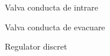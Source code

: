 \documentclass[12pt,english]{article}
\begin{document}
\begin{figure}[H]
  \centering
  \caption{Valva conducta de intrare}
\end{figure}

\begin{figure}[H]
  \centering
  \caption{Valva conducta de evacuare}
\end{figure}

\begin{figure}[H]
  \centering
  \caption{Regulator discret}
\end{figure}
\end{document}
